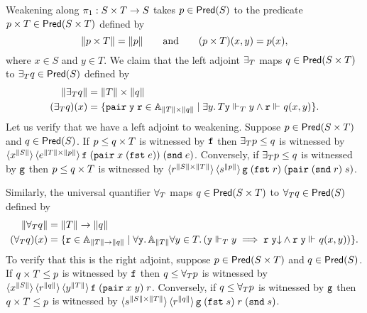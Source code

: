 Weakening along $\pi_1 : \asm{S} \times \asm{T} \to \asm{S}$ takes $p
\in \Pred{\asm{S}}$ to the predicate $p \times \asm{T} \in
\Pred{\asm{S} \times \asm{T}}$ defined by
%
\begin{equation*}
  \T{p \times \asm{T}} = \T{p}
  \qquad\text{and}\qquad
  (p \times \asm{T})(x,y) = p(x),
\end{equation*}
%
where $x \in S$ and $y \in T$. We claim that the left adjoint
$\exists_{\asm{T}}$ maps $q \in \Pred{\asm{S} \times \asm{T}}$ to
$\exists_{\asm{T}} q \in \Pred{\asm{S}}$ defined by
%
\begin{align*}
  \T{\exists_{\asm{T}} q} &= \T{T} \times \T{q} \\
  (\exists_{\asm{T}} q)(x) &=
  \set{ \combPair\;\R{y}\;\R{r} \in \Atyp{\T{T} \times \T{q}} \such
    \some{y}{T}{\R{y} \rz[T] y \land \R{r} \rz q(x,y)}
  }.
\end{align*}
%
Let us verify that we have a left adjoint to weakening. Suppose $p \in
\Pred{\asm{S} \times \asm{T}}$ and $q \in \Pred{\asm{S}}$. If $p \leq
q \times \asm{T}$ is witnessed by $\R{f}$ then $\exists_{\asm{T}} p
\leq q$ is witnessed by $\tpcalam{x}{\T{S}} \tpcalam{e}{\T{T} \times
    \T{p}}{\R{f}\; (\combPair \; x \; (\combFst\; e)) \; (\combSnd \; e)}$.
Conversely, if $\exists_{\asm{T}} p \leq q$ is witnessed by $\R{g}$
then $p \leq q \times \asm{T}$ is witnessed by $\tpcalam{r}{\T{S}
    \times \T{T}} \tpcalam{s}{\T{p}}{\R{g} \;
  (\combFst\;r)\; (\combPair \; (\combSnd \; r) \; s)}$.

Similarly, the universal quantifier $\forall_{\asm{T}}$ maps $q \in
\Pred{\asm{S} \times \asm{T}}$ to $\forall_{\asm{T}} q \in
\Pred{\asm{S}}$ defined by
%
\begin{align*}
  \T{\forall_{\asm{T}} q} &= \T{T} \to \T{q} \\
  (\forall_{\asm{T}} q)(x) &=
  \set{ \R{r} \in \Atyp{\T{T} \to \T{q}} \such
    \all{\R{y}}{\Atyp{\T{T}}}{
      \all{y \in T}
        (\R{y} \rz[T] y \implies
        \defined{\R{r}\;\R{y}} \land
        \R{r}\;\R{y} \rz q(x,y))
    }
  }.
\end{align*}
%
To verify that this is the right adjoint, suppose $p \in \Pred{\asm{S}
  \times \asm{T}}$ and $q \in \Pred{\asm{S}}$. If $q \times \asm{T}
\leq p$ is witnessed by $\R{f}$ then $q \leq \forall_{\asm{T}} p$ is
witnessed by $\tpcalam{x}{\T{S}} \tpcalam{r}{\T{q}}
  \tpcalam{y}{\T{T}}{\R{f} \; (\combPair \; x \; y) \; r}$. Conversely,
if $q \leq \forall_{\asm{T}} p$ is witnessed by $\R{g}$ then $q \times
\asm{T} \leq p$ is witnessed by $\tpcalam{s}{\T{S} \times \T{T}}
  \tpcalam{r}{\T{q}}{\R{g} \; (\combFst \; s) \; r \; (\combSnd \; s)}$.

